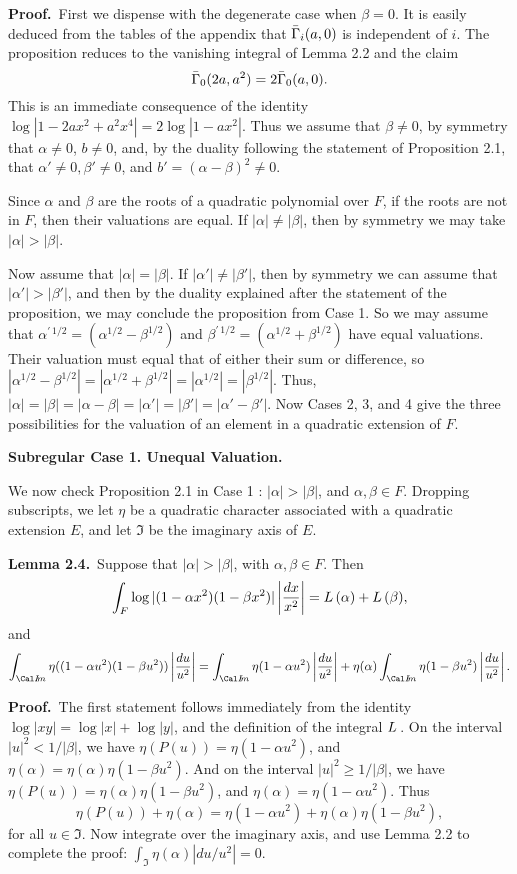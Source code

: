 \noindent
{\bf Proof.}\  First we dispense with the degenerate case when $\beta=0$.
It is easily deduced from the tables of the appendix that $\bar\Gamma_i(a,0)$
is independent of $i$.  The proposition reduces to the vanishing integral
of Lemma 2.2 and the claim
$$\bar\Gamma_0(2a,a^2) = 2\bar\Gamma_0(a,0).$$
This is an immediate consequence of the identity
$\log|1-2a x^2+a^2 x^4| = 2\log|1-a x^2|$.
Thus we assume that $\beta\ne0$, by symmetry that $\alpha\ne0$,
$b\ne 0$, and, by the duality following the statement of
Proposition 2.1, that $\alpha'\ne0,\beta'\ne0$, 
and $b'=(\alpha-\beta)^2\ne0$.

Since $\alpha$ and $\beta$ are the roots of a quadratic
polynomial over $F$, if the roots are not in $F$, then their valuations
are equal.  If $|\alpha|\ne |\beta|$, then by symmetry we may take
$|\alpha|>|\beta|$.

Now assume that $|\alpha|=|\beta|$.  If $|\alpha'|\ne |\beta'|$, then
by symmetry we can assume that $|\alpha'|>|\beta'|$, and then by
the duality explained after the 
statement of the proposition, we may conclude the
proposition from Case 1.  So we may assume that 
$\alpha^{\prime\,1/2} = (\alpha^{1/2}-\beta^{1/2})$ and 
$\beta^{\prime\,1/2} = (\alpha^{1/2}+\beta^{1/2})$ have equal valuations.
Their valuation must equal that of either their sum or difference,
so $|\alpha^{1/2}-\beta^{1/2}| = |\alpha^{1/2}+\beta^{1/2}| = |\alpha^{1/2}|
= |\beta^{1/2}|$.  Thus, $|\alpha|=|\beta|=|\alpha-\beta| =
|\alpha'|=|\beta'| = |\alpha'-\beta'|$.   Now Cases 2, 3, and 4 give
the three possibilities for the valuation of an element in a quadratic
extension of $F$.\hfill\x


\bigskip
\centerline{\bf Subregular Case 1. Unequal Valuation.}
\bigskip

We now check Proposition 2.1 in Case 1 : $|\alpha| >|\beta|$, and $\alpha,
\beta\in F$.  Dropping subscripts, we let $\eta$ be a quadratic character
associated with a quadratic extension $E$, and let $\Im$ be the
imaginary axis of $E$.

\bigskip
\noindent
{\bf Lemma 2.4.}\  Suppose that $|\alpha|>|\beta|$, with $\alpha,\beta\in F$.
Then
$$\int_{F} \log|(1-\alpha x^2)(1-\beta x^2)| \left | {dx\over x^2}\right |
  = {L\,}(\alpha) + {L\,}(\beta), $$
and
$$\int_{\Im} \eta((1-\alpha u^2)(1-\beta u^2))\leftdu
  = \int_{\Im}\eta(1-\alpha u^2) \leftdu +
\eta(\alpha) \int_{\Im}\eta(1-\beta u^2)\leftdu.$$

\bigskip
\noindent
{\bf Proof.}\  The first statement follows immediately from the identity
$\log|xy| = \log|x|+\log|y|$, and the definition of the integral ${L\,}$.
On the interval $|u|^2 < 1/|\beta|$, we have $\eta(P(u)) = \eta(1-\alpha u^2)$,
and $\eta(\alpha)=\eta(\alpha)\eta(1-\beta u^2)$.  
And on the interval
$|u|^2 \ge 1/|\beta|$, we have $\eta(P(u)) = \eta(\alpha)\eta(1-\beta u^2)$,
and $\eta(\alpha)=\eta(1-\alpha u^2)$.  Thus 
$$\eta(P(u)) + \eta(\alpha) = \eta(1-\alpha u^2) + \eta(\alpha)\eta(1-\beta u^2),$$
for all $u\in \Im$.  Now integrate over the imaginary axis, and use Lemma 2.2
to complete the proof: $\int_{\Im} \eta(\alpha) |du/u^2|=0$.\hfill\x

